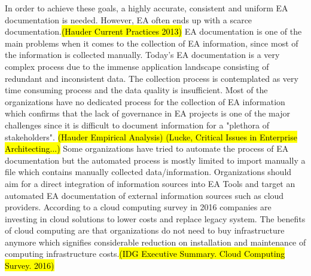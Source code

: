 In order to achieve these goals, a highly accurate, consistent and uniform EA documentation is needed. However, EA often ends up with a scarce documentation.\hl{(Hauder Current Practices 2013)} EA documentation is one of the main problems when it comes to the collection of EA information, since most of the information is collected manually. Today's EA documentation is a very complex process due to the immense application landscape consisting of redundant and inconsistent data. The collection process is contemplated as very time consuming  process and the data quality is insufficient. %
Most of the organizations have no dedicated process for the collection of EA information which confirms that the lack of governance in EA projects is one of the major challenges since it is difficult to document information for a "plethora of stakeholders". \hl{(Hauder Empirical Analysis) (Lucke, Critical Issues in Enterprise Architecting...) } Some organizations have tried to automate the process of EA documentation but the automated process is mostly limited to import manually a file which contains manually collected data/information. 
Organizations should aim for a direct integration of information sources into EA Tools and target an automated EA documentation of external information sources such as cloud providers. 
According to a cloud computing survey in 2016 companies are investing in cloud solutions to lower costs and replace legacy system. The benefits of cloud computing are that organizations do not need to buy infrastructure anymore which signifies considerable reduction on installation and maintenance of computing infrastructure costs.\hl{(IDG Executive Summary. Cloud Computing Survey. 2016)}

